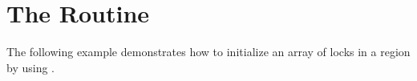\pagebreak
\chapter{The  Routine}
\label{chap:init_lock}

The following example demonstrates how to initialize an array of locks in a  
region by using .



